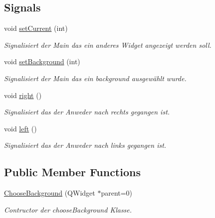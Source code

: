 \subsection*{Signals}
\begin{DoxyCompactItemize}
\item 
void \hyperlink{class_choose_background_afe5384a4f9751980654331f16f9880d6}{set\+Current} (int)
\begin{DoxyCompactList}\small\item\em Signalisiert der Main das ein anderes Widget angezeigt werden soll. \end{DoxyCompactList}\item 
void \hyperlink{class_choose_background_a97f62dc7c7f8c0311bcb4d9de40f8961}{set\+Background} (int)
\begin{DoxyCompactList}\small\item\em Signalisiert der Main das ein background ausgewählt wurde. \end{DoxyCompactList}\item 
void \hyperlink{class_choose_background_a60e09b439c577557e659a7c8cd17ef95}{right} ()
\begin{DoxyCompactList}\small\item\em Signalisiert das der Anweder nach rechts gegangen ist. \end{DoxyCompactList}\item 
void \hyperlink{class_choose_background_ad94244d54915e86b87745df492dab6e6}{left} ()
\begin{DoxyCompactList}\small\item\em Signalisiert das der Anweder nach links gegangen ist. \end{DoxyCompactList}\end{DoxyCompactItemize}
\subsection*{Public Member Functions}
\begin{DoxyCompactItemize}
\item 
\hyperlink{class_choose_background_ab7ee660174665e9bc68eb183817ca099}{Choose\+Background} (Q\+Widget $\ast$parent=0)
\begin{DoxyCompactList}\small\item\em Contructor der choose\+Background Klasse. \end{DoxyCompactList}\end{DoxyCompactItemize}
